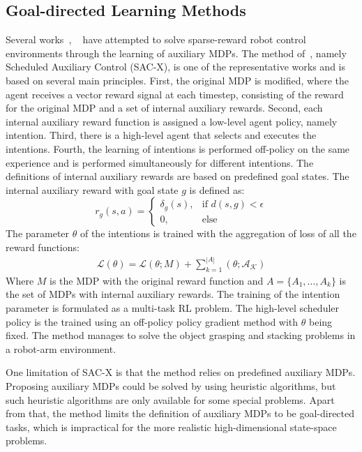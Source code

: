 \subsection{Goal-directed Learning Methods}
Several works~\cite{riedmiller2018learning}, ~\cite{andrychowicz2017hindsight} have attempted to solve sparse-reward robot control environments through the learning of auxiliary MDPs.
The method of~\cite{riedmiller2018learning}, namely Scheduled Auxiliary Control (SAC-X), is one of the representative works and is based on several main principles. First, the original MDP is modified, where the agent receives a vector reward signal at each timestep, consisting of the reward for the original MDP and a set of internal auxiliary rewards. Second, each internal auxiliary reward function is assigned a low-level agent policy, namely intention. Third, there is a high-level agent that selects and executes the intentions. Fourth, the learning of intentions is performed off-policy on the same experience and is performed simultaneously for different intentions.
The definitions of internal auxiliary rewards are based on predefined goal states. The internal auxiliary reward with goal state $g$ is defined as:
\begin{equation}
r_g(s,a)=
\begin{cases}
\delta_g(s),& \text{if } d(s,g)< \epsilon\\
0,              & \text{else}
\end{cases}
\end{equation}
The parameter $\theta$ of the intentions is trained with the aggregation of loss of all the reward functions:
\begin{align}
\mathcal{L}(\theta)  = \mathcal{L}(\theta;M) +\sum_{k=1}^{|A|} (\mathcal{\theta;A_K})
\end{align}
Where $M$ is the MDP with the original reward function and $A=\{A_1,\dots,A_k\}$ is the set of MDPs with internal auxiliary rewards. The training of the intention parameter is formulated as a multi-task RL problem.
The high-level scheduler policy is the trained using an off-policy policy gradient method with $\theta$ being fixed.
The method manages to solve the object grasping and stacking problems in a robot-arm environment. 

One limitation of SAC-X is that the method relies on predefined auxiliary MDPs. Proposing auxiliary MDPs could be solved by using heuristic algorithms, but such heuristic algorithms are only available for some special problems. Apart from that, the method limits the definition of auxiliary MDPs to be goal-directed tasks, which is impractical for the more realistic high-dimensional state-space problems.


